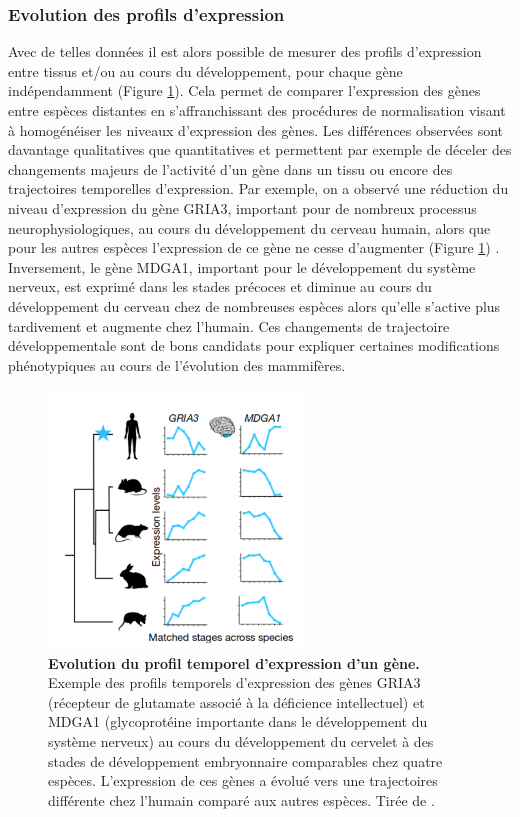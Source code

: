 \subsubsection{Evolution des profils d’expression}
\label{subsub:evol-profil}

Avec de telles données il est alors possible de mesurer des profils d’expression entre tissus et/ou au cours du développement, pour chaque gène indépendamment (Figure \ref{fig:Fig31}). Cela permet de comparer l’expression des gènes entre espèces distantes en s’affranchissant des procédures de normalisation visant à homogénéiser les niveaux d’expression des gènes. Les différences observées sont davantage qualitatives que quantitatives et permettent par exemple de déceler des changements majeurs de l’activité d’un gène dans un tissu ou encore des trajectoires temporelles d’expression. Par exemple, on a observé une réduction du niveau d’expression du gène GRIA3, important pour de nombreux processus neurophysiologiques, au cours du développement du cerveau humain, alors que pour les autres espèces l’expression de ce gène ne cesse d’augmenter (Figure \ref{fig:Fig31}) \citep{cardoso-moreira_gene_2019}. Inversement, le gène MDGA1, important pour le développement du système nerveux, est exprimé dans les stades précoces et diminue au cours du développement du cerveau chez de nombreuses espèces alors qu’elle s’active plus tardivement et augmente chez l’humain. Ces changements de trajectoire développementale sont de bons candidats pour expliquer certaines modifications phénotypiques au cours de l’évolution des mammifères.

\begin{figure}[h]
    \centering
    \includegraphics[width=0.6\textwidth, page=1] {figures/introduction/fig31.png}
    \caption[Evolution du profil temporel d'expression d'un gène.]{
    \textbf{Evolution du profil temporel d'expression d'un gène.}
    Exemple des profils temporels d'expression des gènes GRIA3 (récepteur de glutamate associé à la déficience intellectuel) et MDGA1 (glycoprotéine importante dans le développement du système nerveux) au cours du développement du cervelet à des stades de développement embryonnaire comparables chez quatre espèces. L'expression de ces gènes a évolué vers une trajectoires différente chez l'humain comparé aux autres espèces. Tirée de \citep{cardoso-moreira_gene_2019}.\\
    }
    \label{fig:Fig31}
\end{figure}

